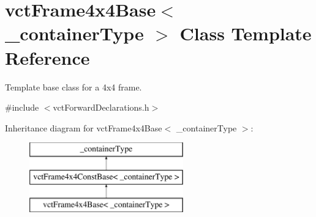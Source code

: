 \hypertarget{classvct_frame4x4_base}{}\section{vct\+Frame4x4\+Base$<$ \+\_\+container\+Type $>$ Class Template Reference}
\label{classvct_frame4x4_base}


Template base class for a 4x4 frame.  




{\ttfamily \#include $<$vct\+Forward\+Declarations.\+h$>$}

Inheritance diagram for vct\+Frame4x4\+Base$<$ \+\_\+container\+Type $>$\+:\begin{figure}[H]
\begin{center}
\leavevmode
\includegraphics[height=3.000000cm]{d8/de5/classvct_frame4x4_base}
\end{center}
\end{figure}

